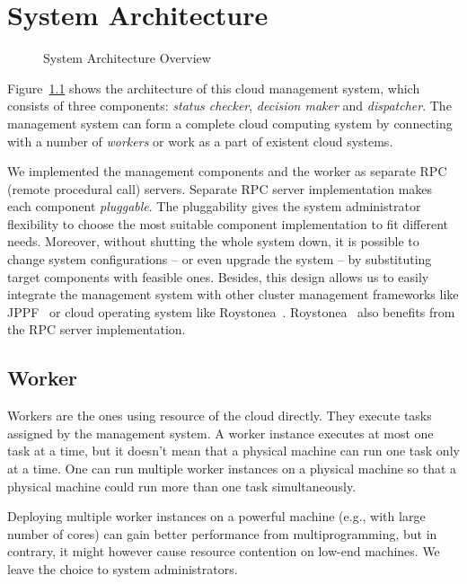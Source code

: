 \chapter{System Architecture}

\begin{figure}
  \centering
  
  \caption{System Architecture Overview}
  \label{fig:archi-overview}
\end{figure}


Figure~\ref{fig:archi-overview} shows the architecture of this cloud
management system, which consists of three components: \emph{status
checker}, \emph{decision maker} and \emph{dispatcher}.  The management
system can form a complete cloud computing system by connecting with a
number of \emph{workers} or work as a part of existent cloud systems.

We implemented the management components and the worker as separate RPC
(remote procedural call) servers.  Separate RPC server implementation
makes each component \emph{pluggable}.  The pluggability gives the
system administrator flexibility to choose the most suitable component
implementation to fit different needs.  Moreover, without shutting the
whole system down, it is possible to change system configurations -- or
even upgrade the system -- by substituting target components with
feasible ones.  Besides, this design allows us to easily integrate the
management system with other cluster management frameworks like
JPPF~\cite{cite:JPPF} or cloud operating system like
Roystonea~\cite{cite:roystonea}.  Roystonea~\cite{cite:roystonea} also
benefits from the RPC server implementation.


\section{Worker}

Workers are the ones using resource of the cloud directly.  They execute
tasks assigned by the management system.  A worker instance executes at
most one task at a time, but it doesn't mean that a physical machine can
run one task only at a time.  One can run multiple worker instances on a
physical machine so that a physical machine could run more than one task
simultaneously.	 

Deploying multiple worker instances on a powerful machine (e.g., with
large number of cores) can gain better performance from
multiprogramming, but in contrary, it might however cause resource
contention on low-end machines.  We leave the choice to system
administrators.  

